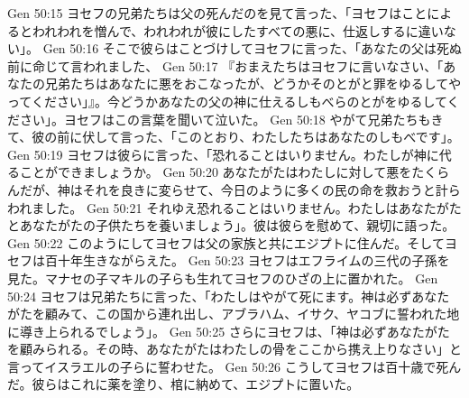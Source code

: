 Gen 50:15  ヨセフの兄弟たちは父の死んだのを見て言った、「ヨセフはことによるとわれわれを憎んで、われわれが彼にしたすべての悪に、仕返しするに違いない」。
Gen 50:16  そこで彼らはことづけしてヨセフに言った、「あなたの父は死ぬ前に命じて言われました、
Gen 50:17  『おまえたちはヨセフに言いなさい、「あなたの兄弟たちはあなたに悪をおこなったが、どうかそのとがと罪をゆるしてやってください」』。今どうかあなたの父の神に仕えるしもべらのとがをゆるしてください」。ヨセフはこの言葉を聞いて泣いた。
Gen 50:18  やがて兄弟たちもきて、彼の前に伏して言った、「このとおり、わたしたちはあなたのしもべです」。
Gen 50:19  ヨセフは彼らに言った、「恐れることはいりません。わたしが神に代ることができましょうか。
Gen 50:20  あなたがたはわたしに対して悪をたくらんだが、神はそれを良きに変らせて、今日のように多くの民の命を救おうと計らわれました。
Gen 50:21  それゆえ恐れることはいりません。わたしはあなたがたとあなたがたの子供たちを養いましょう」。彼は彼らを慰めて、親切に語った。
Gen 50:22  このようにしてヨセフは父の家族と共にエジプトに住んだ。そしてヨセフは百十年生きながらえた。
Gen 50:23  ヨセフはエフライムの三代の子孫を見た。マナセの子マキルの子らも生れてヨセフのひざの上に置かれた。
Gen 50:24  ヨセフは兄弟たちに言った、「わたしはやがて死にます。神は必ずあなたがたを顧みて、この国から連れ出し、アブラハム、イサク、ヤコブに誓われた地に導き上られるでしょう」。
Gen 50:25  さらにヨセフは、「神は必ずあなたがたを顧みられる。その時、あなたがたはわたしの骨をここから携え上りなさい」と言ってイスラエルの子らに誓わせた。
Gen 50:26  こうしてヨセフは百十歳で死んだ。彼らはこれに薬を塗り、棺に納めて、エジプトに置いた。


